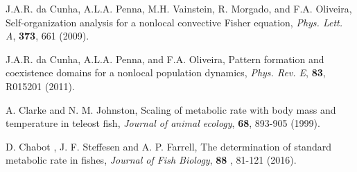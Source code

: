 \documentclass[10pt]{iopart}
\begin{document}
\begin{thebibliography}{100}
{ {J.A.R. da Cunha, A.L.A. Penna, M.H. Vainstein, R. Morgado, and F.A. Oliveira}, {Self-organization analysis for a nonlocal convective Fisher equation}, \textit{Phys. Lett. A}, \textbf{373}, 661 {(2009)}.

 {J.A.R. da Cunha, A.L.A. Penna, and F.A. Oliveira}, {Pattern formation and coexistence domains for a nonlocal population dynamics}, \textit{Phys. Rev. E}, \textbf{83}, {R015201} {(2011)}.

 { A. Clarke and  N. M. Johnston}, {Scaling of metabolic rate with body mass and temperature in teleost fish}, \textit{Journal of animal ecology}, \textbf{68},  893-905 (1999).}

 {D. Chabot , J. F. Steffesen and A. P. Farrell}, {The determination of standard metabolic rate in fishes}, \textit{Journal of Fish Biology}, \textbf{88} , 81-121 (2016).

\end{thebibliography}
\end{document}
